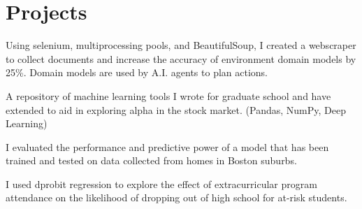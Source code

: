 \documentclass[]{deedy-resume-openfont}
\begin{document}
\begin{minipage}[t]{0.66\textwidth}
\section{Projects}


\begin{tightemize}
\item Using selenium, multiprocessing pools, and BeautifulSoup, I created a webscraper to collect documents and increase the accuracy of environment domain models by 25\%. Domain models are used by A.I. agents to plan actions.
\end{tightemize}

\begin{tightemize}
\item A repository of machine learning tools I wrote for graduate school and have extended to aid in exploring alpha in the stock market. (Pandas, NumPy, Deep Learning)
\end{tightemize}

\begin{tightemize}
\item I evaluated the performance and predictive power of a model that has been trained and tested on data collected from homes in Boston suburbs.
\end{tightemize}


\begin{tightemize}
\item I used dprobit regression to explore the effect of extracurricular program attendance on the likelihood of dropping out of high school for at-risk students.
\end{tightemize}



\end{minipage}
\end{document}
